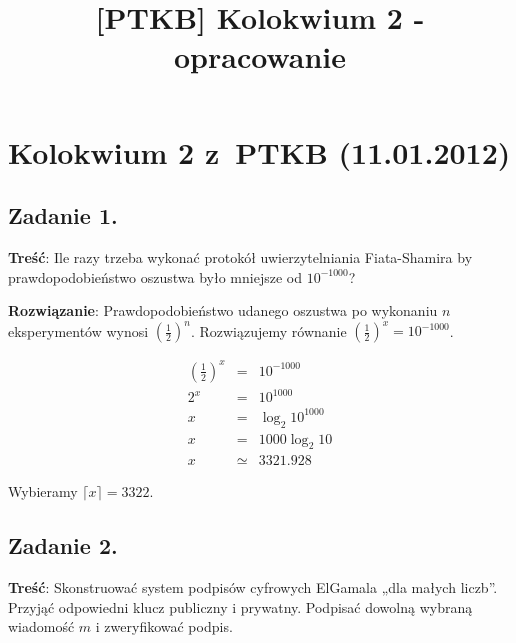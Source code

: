 \documentclass[a4paper,10pt, twocolumn]{article}
\title{[PTKB] Kolokwium 2 - opracowanie}
\author{}
\date{}
\begin{document}
\maketitle

\section{Kolokwium 2 z~PTKB (11.01.2012)}

\subsection{Zadanie 1.}
\label{subsec:KolZadanie1}

\textbf{Treść}: Ile razy trzeba wykonać protokół uwierzytelniania Fiata-Shamira by prawdopodobieństwo oszustwa było mniejsze od $10^{-1000}$?

\textbf{Rozwiązanie}: Prawdopodobieństwo udanego oszustwa po wykonaniu $n$ eksperymentów wynosi $(\frac{1}{2})^{n}$. Rozwiązujemy równanie $(\frac{1}{2})^{x} = 10^{-1000}$.

\begin{equation*}
 \begin{array}{lcl} (\frac{1}{2})^{x} & = & 10^{-1000} \\ 2^{x} & = & 10^{1000} \\ x & = & \log_{2} 10^{1000} \\ x & = & 1000 \log_{2} 10 \\ x & \simeq & 3321.928 \end{array}
\end{equation*}

Wybieramy $\lceil x \rceil = 3322$.

\subsection{Zadanie 2.}

\textbf{Treść}: Skonstruować system podpisów cyfrowych ElGamala „dla małych liczb”. Przyjąć odpowiedni klucz publiczny i prywatny. Podpisać dowolną wybraną wiadomość $m$ i zweryfikować podpis.
\end{document}
